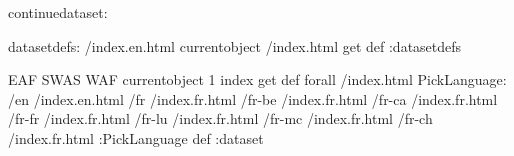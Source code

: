 \begin{ingrid}
continuedataset:

datasetdefs:
/index.en.html currentobject /index.html get def
:datasetdefs

{ EAF  SWAS  WAF } { currentobject 1 index get def } forall
/index.html {
PickLanguage:
/en /index.en.html
/fr /index.fr.html
/fr-be /index.fr.html
/fr-ca /index.fr.html
/fr-fr /index.fr.html
/fr-lu /index.fr.html
/fr-mc /index.fr.html
/fr-ch /index.fr.html
:PickLanguage
} def
:dataset
\end{ingrid}
